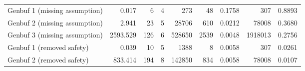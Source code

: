 \begin{tabular}{|l|rr|rr|rr|rr|}
  Genbuf 1 (missing assumption) & 0.017 & 6 & 4 & 273 & 48 & 0.1758 & 307 & 0.8893 \\ 
  Genbuf 2 (missing assumption) & 2.941 & 23 & 5 & 28706 & 610 & 0.0212 & 78008 & 0.3680 \\ 
  Genbuf 3 (missing assumption) & 2593.529 & 126 & 6 & 528650 & 2539 & 0.0048 & 1918013 & 0.2756 \\ 
  Genbuf 1 (removed safety) & 0.039 & 10 & 5 & 1388 & 8 & 0.0058 & 307 & 0.0261 \\ 
  Genbuf 2 (removed safety) & 833.414 & 194 & 8 & 142850 & 834 & 0.0058 & 78008 & 0.0107 \\ 
   \hline
\end{tabular}
